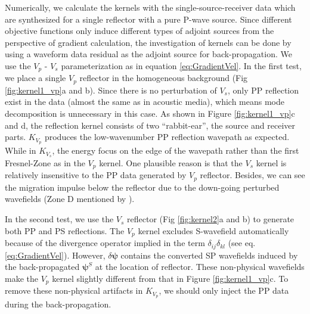 Numerically, we calculate the kernels with the single-source-receiver data
which are synthesized for a single reflector with a pure P-wave source.
Since different objective functions only induce different types of adjoint
sources from the perspective of gradient calculation, the investigation of kernels can
be done by using a waveform data residual as the adjoint source for back-propagation.
We use the $V_p$ - $V_s$ parameterization as in equation \eqref{eq:GradientVel}.
In the first test, we place a single $V_p$ reflector in the homogeneous background (Fig \ref{fig:kernel1_vp}a and b). 
Since there is no perturbation of $V_s$, only PP reflection exist in the data (almost
the same as in acoustic media), which means mode decomposition is unnecessary in this
case.
As shown in Figure \ref{fig:kernel1_vp}c and d, the reflection kernel consists of two ``rabbit-ear'', the
source and receiver parts. $K_{V_p}$ produces the low-wavenumber PP reflection
wavepath as expected.
While in $K_{V_s}$, the energy focus on the edge of the wavepath rather than the first Fresnel-Zone as in the $V_p$ kernel.
One plausible reason is that the $V_s$ kernel is relatively insensitive to the PP data generated by $V_p$ reflector.
Besides, we can see the migration impulse below the reflector due to the down-going perturbed wavefields
(Zone D mentioned by \cite{Zhou2015}).


In the second test, we use the $V_s$ reflector (Fig \ref{fig:kernel2}a and b) to generate both PP
and PS reflections.
The $V_p$ kernel excludes S-wavefield automatically because of the divergence operator 
implied in the term $\delta_{ij}\delta_{kl}$ (see eq. \eqref{eq:GradientVel}). 
However, $\delta \boldsymbol{\psi}$ contains the converted SP wavefields 
induced by the back-propagated  $\boldsymbol{\psi}^S$ at the location of reflector.
These non-physical wavefields make the $V_p$ kernel slightly different from that in Figure \ref{fig:kernel1_vp}c.
To remove these non-physical artifacts in $K_{V_p}$, we should only inject the PP data during the
back-propagation. 

